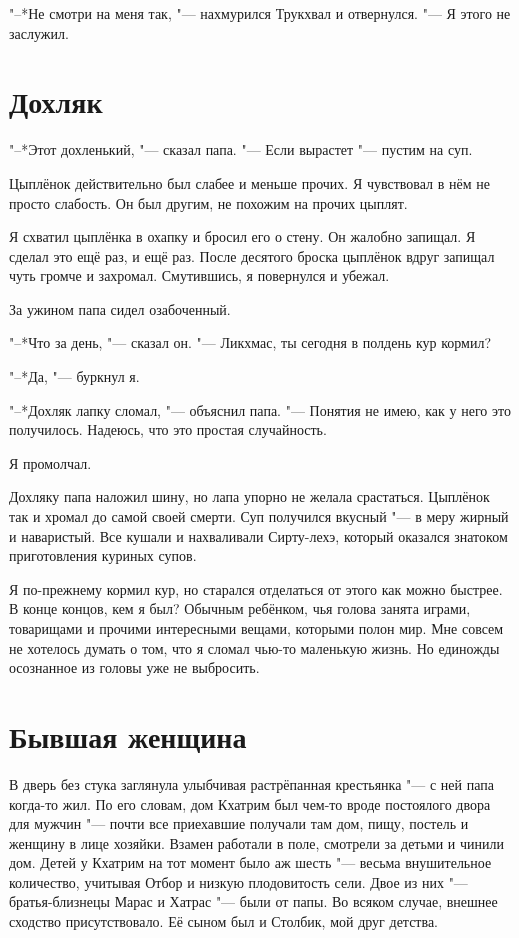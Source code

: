 \documentclass[a4paper,10pt]{book}
\begin{document}
"--*Не смотри на меня так, "--- нахмурился Трукхвал и отвернулся. "--- Я этого 
не заслужил.
 
\section{Дохляк}
 
"--*Этот дохленький, "--- сказал папа. "--- Если вырастет "--- пустим на суп. 

Цыплёнок действительно был слабее и меньше прочих. Я чувствовал в нём не просто 
слабость. Он был другим, не похожим на прочих цыплят.

Я схватил цыплёнка в охапку и бросил его о стену. Он жалобно запищал. Я сделал 
это ещё раз, и ещё раз. После десятого броска цыплёнок вдруг запищал чуть 
громче и захромал. Смутившись, я повернулся и убежал.

За ужином папа сидел озабоченный.

"--*Что за день, "--- сказал он. "--- Ликхмас, ты сегодня в полдень кур кормил?

"--*Да, "--- буркнул я.

"--*Дохляк лапку сломал, "--- объяснил папа. "--- Понятия не имею, как у него 
это получилось. Надеюсь, что это простая случайность.

Я промолчал.

Дохляку папа наложил шину, но лапа упорно не желала срастаться. Цыплёнок так и 
хромал до самой своей смерти. Суп получился вкусный "--- в меру жирный и 
наваристый. Все кушали и нахваливали Сирту-лехэ, который оказался знатоком 
приготовления куриных супов.

Я по-прежнему кормил кур, но старался отделаться от этого как можно быстрее. В 
конце концов, кем я был? Обычным ребёнком, чья голова занята играми, товарищами 
и прочими интересными вещами, которыми полон мир. Мне совсем не хотелось думать 
о том, что я сломал чью-то маленькую жизнь. Но единожды осознанное из головы 
уже не выбросить.
 
 \section{Бывшая женщина}
 
В дверь без стука заглянула улыбчивая растрёпанная крестьянка "--- с ней папа 
когда-то жил. По его словам, дом Кхатрим был чем-то вроде постоялого двора для 
мужчин "--- почти все приехавшие получали там дом, пищу, постель и женщину в 
лице хозяйки. Взамен работали в поле, смотрели за детьми и чинили дом. Детей у 
Кхатрим на тот момент было аж шесть "--- весьма внушительное количество, 
учитывая Отбор и низкую плодовитость сели. Двое из них "--- братья-близнецы 
Марас и Хатрас "--- были от папы. Во всяком случае, внешнее сходство 
присутствовало. Её сыном был и Столбик, мой друг детства.
\end{document}
